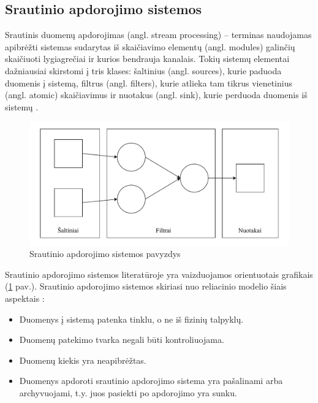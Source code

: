 \documentclass{VUMIFPSbakalaurinis}
\begin{document}
\subsection{Srautinio apdorojimo sistemos}
Srautinis duomenų apdorojimas (angl. stream processing) – terminas naudojamas apibrėžti sistemas sudarytas iš skaičiavimo elementų (angl. modules) galinčių skaičiuoti lygiagrečiai ir kurios bendrauja kanalais. Tokių sistemų elementai dažniausiai skirstomi į tris klases: šaltinius (angl. sources), kurie paduoda duomenis į sistemą, filtrus (angl. filters), kurie atlieka tam tikrus vienetinius (angl. atomic) skaičiavimus ir nuotakus (angl. sink), kurie perduoda duomenis iš sistemų \cite{stephens1997survey}. 
\begin{figure}[H]
    \includegraphics[width=15cm]{img/Srautinio apdorojimo sistema.pdf}
    \caption{Srautinio apdorojimo sistemos pavyzdys}
    \label{srautinio–apdorojimo–sistema}
\end{figure} 
Srautinio apdorojimo sistemos literatūroje yra vaizduojamos orientuotais grafikais (\ref{srautinio–apdorojimo–sistema} pav.). Srautinio apdorojimo sistemos skiriasi nuo reliacinio modelio šiais aspektais \cite{babcock2002models}: 
\begin{itemize}
    \item Duomenys į sistemą patenka tinklu, o ne iš fizinių talpyklų.
    \item Duomenų patekimo tvarka negali būti kontroliuojama.
    \item Duomenų kiekis yra neapibrėžtas.
    \item Duomenys apdoroti srautinio apdorojimo sistema yra pašalinami arba archyvuojami, t.y. juos pasiekti po apdorojimo yra sunku. 
\end{itemize}
\end{document}
